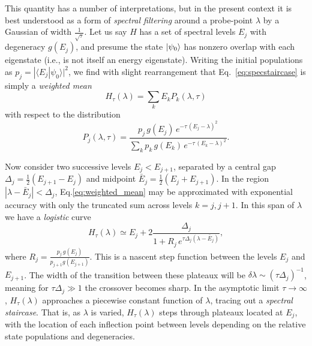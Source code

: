 \documentclass[reprint, aps,prx,showpacs,bibfootnote,preprintnumbers, mathtools, superscriptaddress, amsmath,amssymb]{revtex4-2}
\begin{document}
This quantity has a number of interpretations, but in the present context it is best understood as a form of \textit{spectral filtering} around a probe-point $\lambda$ by a Gaussian of width $\frac{1}{\sqrt{\tau}}$. Let us say $H$ has a set of spectral levels $E_j$ with degeneracy $g(E_j)$, and presume the state $\ket{\psi_0}$ has nonzero overlap with each eigenstate (i.e., is not itself an energy eigenstate). Writing the initial populations as \(p_j=|\langle E_j|\psi_0\rangle|^{2}\), we find with slight rearrangement that Eq.~\eqref{eq:specstaircase} is simply a \emph{weighted mean}
\begin{equation}
 H_\tau(\lambda)= \sum_{k}E_k P_k(\lambda,\tau)
  \label{eq:weighted_mean}
\end{equation}
with respect to the distribution
\begin{equation}
 P_j(\lambda,\tau)= \frac{p_j\,g(E_j)\,
  e^{-\tau\,(E_j-\lambda)^{2}}}{\sum_k p_k\,g(E_k)\,
  e^{-\tau\,(E_k-\lambda)^{2}}}.
\end{equation}

Now consider two successive levels $E_j<E_{j+1}$, separated by a central gap \(\Delta_j=\frac{1}{2}(E_{j+1}-E_j)\) and midpoint \(\bar E_j=\tfrac12(E_j+E_{j+1})\). In the region \(|\lambda-\bar E_j|<\Delta_j\), Eq.\eqref{eq:weighted_mean} may be approximated with exponential accuracy with only the truncated sum across levels \(k=j,j\!+\!1\). In this span of $\lambda$ we have a \textit{logistic} curve
\begin{equation}
  H_\tau (\lambda) \simeq
  E_j +
  2\frac{\Delta_j}{
        1 +
        R_j\,e^{\tau\Delta_j(\lambda-\bar{E}_j)}},
  \label{eq:logistic}
\end{equation}
where $R_j=\frac{p_j\,g(E_j)}{p_{j+1}g(E_{j+1})}$. This is a nascent step function between the levels $E_j$ and $E_{j+1}$. The width of the transition between these plateaux will be
\(\delta\lambda\sim(\tau\Delta_j)^{-1}\), meaning
for \(\tau\Delta_j\gg1\) the crossover becomes sharp. In the asymptotic limit $\tau\to\infty$, $H_\tau(\lambda)$ approaches a piecewise constant function of $\lambda$, tracing out a \emph{spectral staircase}. That is, as $\lambda$ is varied, $H_\tau(\lambda)$ steps through plateaux located at $E_j$, with the location of each inflection point between levels depending on the relative state populations and degeneracies.
\end{document}
